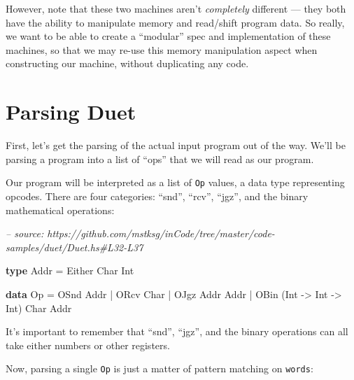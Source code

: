 \documentclass[]{article}
\newenvironment{Shaded}{}{}
\newcommand{\CommentTok}[1]{\textcolor[rgb]{0.38,0.63,0.69}{\textit{#1}}}
\newcommand{\DataTypeTok}[1]{\textcolor[rgb]{0.56,0.13,0.00}{#1}}
\newcommand{\FunctionTok}[1]{\textcolor[rgb]{0.02,0.16,0.49}{#1}}
\newcommand{\KeywordTok}[1]{\textcolor[rgb]{0.00,0.44,0.13}{\textbf{#1}}}
\newcommand{\NormalTok}[1]{#1}
\newcommand{\OtherTok}[1]{\textcolor[rgb]{0.00,0.44,0.13}{#1}}
\begin{document}
However, note that these two machines aren't \emph{completely} different ---
they both have the ability to manipulate memory and read/shift program data. So
really, we want to be able to create a ``modular'' spec and implementation of
these machines, so that we may re-use this memory manipulation aspect when
constructing our machine, without duplicating any code.

\hypertarget{parsing-duet}{%
\section{Parsing Duet}\label{parsing-duet}}

First, let's get the parsing of the actual input program out of the way. We'll
be parsing a program into a list of ``ops'' that we will read as our program.

Our program will be interpreted as a list of \texttt{Op} values, a data type
representing opcodes. There are four categories: ``snd'', ``rcv'', ``jgz'', and
the binary mathematical operations:

\begin{Shaded}
\begin{Highlighting}[]
\CommentTok{-- source: https://github.com/mstksg/inCode/tree/master/code-samples/duet/Duet.hs#L32-L37}

\KeywordTok{type} \DataTypeTok{Addr} \FunctionTok{=} \DataTypeTok{Either} \DataTypeTok{Char} \DataTypeTok{Int}

\KeywordTok{data} \DataTypeTok{Op} \FunctionTok{=} \DataTypeTok{OSnd} \DataTypeTok{Addr}
        \FunctionTok{|} \DataTypeTok{ORcv} \DataTypeTok{Char}
        \FunctionTok{|} \DataTypeTok{OJgz} \DataTypeTok{Addr} \DataTypeTok{Addr}
        \FunctionTok{|} \DataTypeTok{OBin}\NormalTok{ (}\DataTypeTok{Int} \OtherTok{->} \DataTypeTok{Int} \OtherTok{->} \DataTypeTok{Int}\NormalTok{) }\DataTypeTok{Char} \DataTypeTok{Addr}
\end{Highlighting}
\end{Shaded}

It's important to remember that ``snd'', ``jgz'', and the binary operations can
all take either numbers or other registers.

Now, parsing a single \texttt{Op} is just a matter of pattern matching on
\texttt{words}:
\end{document}
